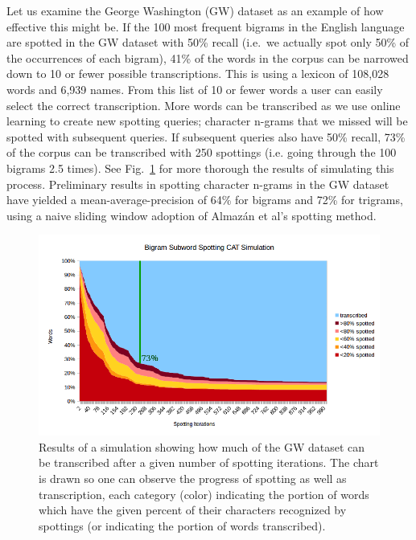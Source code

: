 \documentclass[conference]{IEEEtran}
\begin{document}
Let us examine the George Washington (GW) dataset\cite{GW} as an example of how effective this might be. If the 100 most frequent bigrams in the English language are spotted in the GW dataset with 50\% recall (i.e.~we actually spot only 50\% of the occurrences of each bigram), 41\% of the words in the corpus can be narrowed down to 10 or fewer possible transcriptions. This is using a lexicon of 108,028 words and 6,939 names. From this list of 10 or fewer words a user can easily select the correct transcription. More words can be transcribed as we use online learning to create new spotting queries; character n-grams that we missed will be spotted with subsequent queries. If subsequent queries also have 50\% recall, 73\% of the corpus can be transcribed with 250 spottings (i.e. going through the 100 bigrams 2.5 times). See Fig.~\ref{fig:fullSim} for more thorough the results of simulating this process. Preliminary results in spotting character n-grams in the GW dataset have yielded a mean-average-precision of 64\% for bigrams and 72\% for trigrams, using a naive sliding window adoption of Almaz\'{a}n et al's\cite{Almazan2014} spotting method.


\begin{figure}
    \centering
    \includegraphics[width=.49\textwidth]{simulationGraph_big_line}
    \caption{Results of a simulation showing how much of the GW dataset can be transcribed after a given number of spotting iterations. The chart is drawn so one can observe the progress of spotting as well as transcription, each category (color) indicating the portion of words which have the given percent of their characters recognized by spottings (or indicating the portion of words transcribed).}
    \label{fig:fullSim}
\end{figure}
\end{document}
